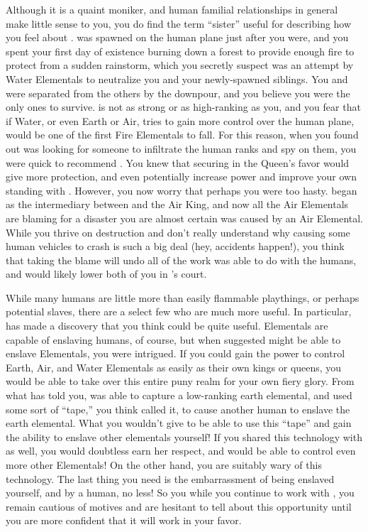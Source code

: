 \documentclass[char]{elementals}
\begin{document}
Although it is a quaint moniker, and human familial relationships in general make little sense to you, you do find the term ``sister'' useful for describing how you feel about \cJuliet{}.  \cJuliet{\They} was spawned on the human plane just after you were, and you spent your first day of existence burning down a forest to provide enough fire to protect \cJuliet{\them} from a sudden rainstorm, which you secretly suspect was an attempt by Water Elementals to neutralize you and your newly-spawned siblings.  You and \cJuliet{} were separated from the others by the downpour, and you believe you were the only ones to survive. \cJuliet{\they} is not as strong or as high-ranking as you, and you fear that if Water, or even Earth or Air, tries to gain more control over the human plane, \cJuliet{\they} would be one of the first Fire Elementals to fall. For this reason, when you found out \cQueen{} was looking for someone to infiltrate the human ranks and spy on them, you were quick to recommend \cJuliet{}.  You knew that securing \cJuliet{\them} in the Queen's favor would give \cJuliet{\them} more protection, and even potentially increase \cJuliet{\their} power and improve your own standing with \cQueen{}.  However, you now worry that perhaps you were too hasty.  \cJuliet{} began as the intermediary between \cQueen{} and the Air King, and now all the Air Elementals are blaming \cJuliet{\them} for a disaster you are almost certain was caused by an Air Elemental.  While you thrive on destruction and don't really understand why causing some human vehicles to crash is such a big deal (hey, accidents happen!), you think that \cJuliet{} taking the blame will undo all of the work \cJuliet{\they} was able to do with the humans, and would likely lower both of you in \cQueen{}'s court.

While many humans are little more than easily flammable playthings, or perhaps potential slaves, there are a select few who are much more useful.  In particular, \cMS{\intro} has made a discovery that you think could be quite useful.  Elementals are capable of enslaving humans, of course, but when \cMS{} suggested  might be able to enslave Elementals, you were intrigued.  If you could gain the power to control Earth, Air, and Water Elementals as easily as their own kings or queens, you would be able to take over this entire puny realm for your own fiery glory.  From what \cMS{} has told you, \cMS{\they} was able to capture a low-ranking earth elemental, and used some sort of ``tape,'' you think  called it, to cause another human to enslave the earth elemental.  What you wouldn't give to be able to use this ``tape'' and gain the ability to enslave other elementals yourself!  If you shared this technology with \cQueen{} as well, you would doubtless earn her respect, and  would be able to control even more other Elementals!  On the other hand, you are suitably wary of this technology.  The last thing you need is the embarrassment of being enslaved yourself, and by a human, no less!  So you while you continue to work with \cMS{}, you remain cautious of \cMS{\their} motives and are hesitant to tell \cQueen{} about this opportunity until you are more confident that it will work in your favor.
\end{document}
